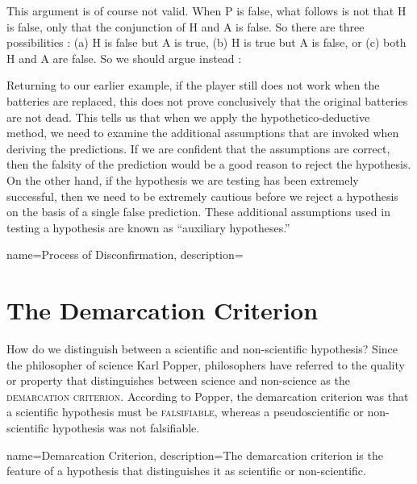\begin{kormanize}
\end{kormanize}

This argument is of course not valid. When P is false, what follows is not that H is false, only that the conjunction of H and A is false. So there are three possibilities : (a) H is false but A is true, (b) H is true but A is false, or (c) both H and A are false. So we should argue instead :

\begin{kormanize}
\end{kormanize}

Returning to our earlier example, if the player still does not work when the batteries are replaced, this does not prove conclusively that the original batteries are not dead. This tells us that when we apply the hypothetico-deductive method, we need to examine the additional assumptions that are invoked when deriving the predictions. If we are confident that the assumptions are correct, then the falsity of the prediction would be a good reason to reject the hypothesis. On the other hand, if the hypothesis we are testing has been extremely successful, then we need to be extremely cautious before we reject a hypothesis on the basis of a single false prediction. These additional assumptions used in testing a hypothesis are known as ``auxiliary hypotheses.''

{
name=Process of Disconfirmation,
description={}
}

\section{The Demarcation Criterion}

How do we distinguish between a scientific and non-scientific hypothesis? Since the philosopher of science Karl Popper, philosophers have referred to the quality or property that distinguishes between science and non-science as the \textsc{\gls{demarcation criterion}}. According to Popper, the demarcation criterion was that a scientific hypothesis must be \textsc{\gls{falsifiable}}, whereas a pseudoscientific or non-scientific hypothesis was not falsifiable.

{
name=Demarcation Criterion,
description={The demarcation criterion is the feature of a hypothesis that distinguishes it as scientific or non-scientific.}
}

